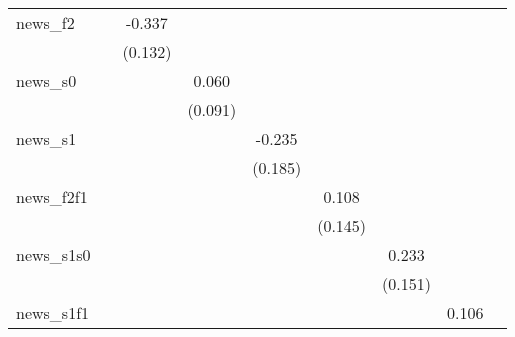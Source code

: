 {\begin{tabular}{l*{8}{c}}
news\_f2     &                     &      -0.337\sym{**} &                     &                     &                     &                     &                     &                     \\
            &                     &     (0.132)         &                     &                     &                     &                     &                     &                     \\
\addlinespace
news\_s0     &                     &                     &       0.060         &                     &                     &                     &                     &                     \\
            &                     &                     &     (0.091)         &                     &                     &                     &                     &                     \\
\addlinespace
news\_s1     &                     &                     &                     &      -0.235         &                     &                     &                     &                     \\
            &                     &                     &                     &     (0.185)         &                     &                     &                     &                     \\
\addlinespace
news\_f2f1   &                     &                     &                     &                     &       0.108         &                     &                     &                     \\
            &                     &                     &                     &                     &     (0.145)         &                     &                     &                     \\
\addlinespace
news\_s1s0   &                     &                     &                     &                     &                     &       0.233         &                     &                     \\
            &                     &                     &                     &                     &                     &     (0.151)         &                     &                     \\
\addlinespace
news\_s1f1   &                     &                     &                     &                     &                     &                     &       0.106         &                     \\

\end{tabular}}
